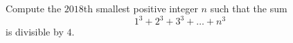 Compute the $2018$th smallest positive integer $n$ such that the sum \[1^3+2^3+3^3+\ldots+n^3\] is divisible by $4$.